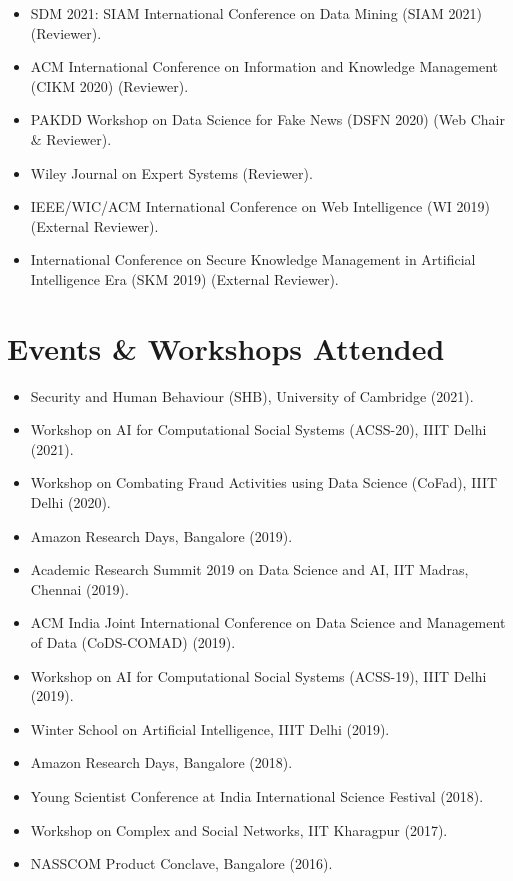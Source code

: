 \documentclass[margin, centered]{res}
\begin{document}
\begin{resume}
\begin{itemize}[leftmargin=*]
	\item SDM 2021: SIAM International Conference on Data Mining (SIAM 2021) (Reviewer).
	\item ACM International Conference on Information and Knowledge Management (CIKM 2020) (Reviewer).
	\item PAKDD Workshop on Data Science for Fake News (DSFN 2020) (Web Chair \& Reviewer).
	\item Wiley Journal on Expert Systems (Reviewer).
	\item IEEE/WIC/ACM International Conference on Web Intelligence (WI 2019) (External Reviewer).
	\item International Conference on Secure Knowledge Management in Artificial Intelligence Era (SKM 2019) (External Reviewer).
\end{itemize}

\section{Events \& Workshops Attended}
\begin{itemize}[leftmargin=*]
\item Security and Human Behaviour (SHB), University of Cambridge (2021).
\item Workshop on AI for Computational Social Systems (ACSS-20), IIIT Delhi (2021).
\item Workshop on Combating Fraud Activities using Data Science (CoFad), IIIT Delhi (2020).
\item Amazon Research Days, Bangalore (2019).
\item Academic Research Summit 2019 on Data Science and AI, IIT Madras, Chennai (2019).
\item ACM India Joint International Conference on Data Science and Management of Data (CoDS-COMAD) (2019).
\item Workshop on AI for Computational Social Systems (ACSS-19), IIIT Delhi (2019).
\item Winter School on Artificial Intelligence,  IIIT Delhi (2019).
\item Amazon Research Days, Bangalore (2018).
\item Young Scientist Conference at India International Science Festival (2018).
\item Workshop on Complex and Social Networks, IIT Kharagpur (2017).
\item NASSCOM Product Conclave, Bangalore (2016).
\end{itemize}


\end{resume}
\end{document}
